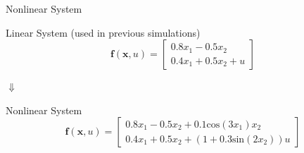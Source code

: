 \documentclass[student, noshadow, itr, english, aspectratio=169]{ITR_LSR_slides}
\begin{document}
\begin{frame}{Nonlinear System}

\begin{block}{Linear System (used in previous simulations)}
\begin{equation*}
\boldsymbol{f}(\boldsymbol{x}, u) = 
\begin{bmatrix}
0.8  x_1 - 0.5 x_2 \\
0.4 x_1 + 0.5 x_2 + u
\end{bmatrix}
\end{equation*}
\end{block}	

\makebox[6.7cm]{\hfill} $\boldsymbol{\Downarrow}$ 

\begin{block}{Nonlinear System}
\begin{equation*}
\boldsymbol{f}(\boldsymbol{x}, u) = 
\begin{bmatrix}
0.8  x_1 - 0.5 x_2 + 0.1 \text{cos}(3 x_1) x_2\\
0.4 x_1 + 0.5 x_2 + (1 + 0.3 \text{sin} (2 x_2 )) u
\end{bmatrix}
\end{equation*}
\end{block}
\end{frame}	
\end{document}
